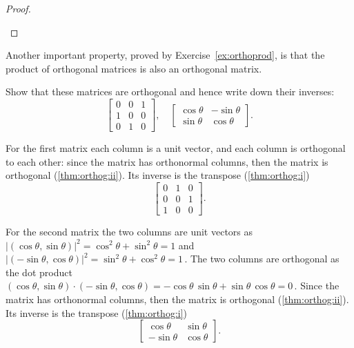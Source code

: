 \begin{proof}
\begin{description}
\end{description}
\end{proof}


Another important property,  proved by Exercise~\ref{ex:orthoprod}, is that the product of orthogonal matrices is also an orthogonal matrix.

\begin{example} \label{eg:}
Show that these matrices are orthogonal and hence write down their inverses:
\begin{equation*}
\begin{bmatrix} 0&0&1\\1&0&0\\0&1&0 \end{bmatrix},\quad
\begin{bmatrix} \cos\theta&-\sin\theta\\\sin\theta&\cos\theta \end{bmatrix}.
\end{equation*}

\begin{solution} 
For the first matrix each column is a unit vector, and each column is orthogonal to each other: since the matrix has orthonormal columns, then the matrix is orthogonal (\autoref{thm:orthog:ii}).
Its inverse is the transpose (\autoref{thm:orthog:i})
\begin{equation*}
\begin{bmatrix} 0&1&0\\0&0&1\\1&0&0 \end{bmatrix}.
\end{equation*}

For the second matrix the two columns are unit vectors as
\(|(\cos\theta,\sin\theta)|^2=\cos^2\theta+\sin^2\theta=1\) and \(|(-\sin\theta,\cos\theta)|^2=\sin^2\theta+\cos^2\theta=1\)\,.
The two columns are orthogonal as the dot product \((\cos\theta,\sin\theta)\cdot(-\sin\theta,\cos\theta)=-\cos\theta\,\sin\theta+\sin\theta\,\cos\theta=0\)\,.  
Since the matrix has orthonormal columns, then the matrix is orthogonal (\autoref{thm:orthog:ii}).
Its inverse is the transpose (\autoref{thm:orthog:i})
\begin{equation*}
\begin{bmatrix} \cos\theta&\sin\theta\\-\sin\theta&\cos\theta \end{bmatrix}.
\end{equation*}
\end{solution}
\end{example}




